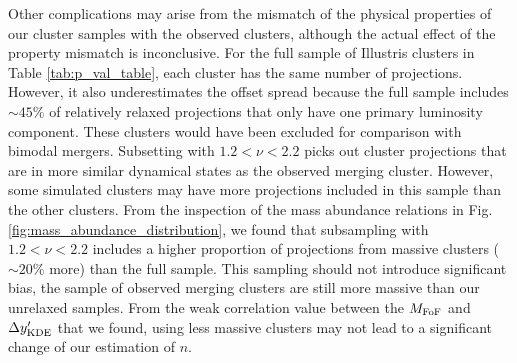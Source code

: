
Other complications may arise from the mismatch of the physical properties of 
our cluster samples with the observed clusters, although the actual effect of the
property mismatch is inconclusive. 
For the full sample of Illustris clusters in Table \ref{tab:p_val_table}, 
each cluster has the same number of projections. 
However, it also underestimates the offset spread because the
full sample includes $\sim 45\%$ of relatively relaxed projections 
that only have one primary luminosity component.  These clusters would
have been excluded for comparison with bimodal mergers. 
Subsetting with $1.2 < \nu < 2.2$ picks out
cluster projections that are in more similar dynamical states as the observed merging
cluster. 
However, some simulated clusters may have more projections included in this sample
than the other clusters. From the inspection of the mass abundance relations in 
Fig. \ref{fig:mass_abundance_distribution}, we found that subsampling with $1.2 <
\nu <2.2$ includes a higher proportion of projections from massive clusters
($\sim 20\%$ more) than 
the full sample. 
This sampling should not introduce significant bias, 
the sample of observed merging clusters are still more massive than our
unrelaxed samples. From the weak correlation value between the $M_{\rm FoF}$ and
$\Delta y_{\rm KDE}'$ that we found, using less massive clusters may not lead to a significant
change of our estimation of $n$.  

